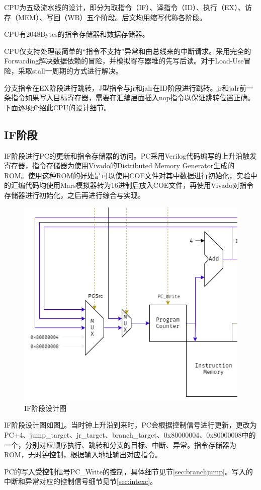 \documentclass[a4paper]{article}
\begin{document}
CPU为五级流水线的设计，即分为取指令（IF）、译指令（ID）、执行（EX）、访存（MEM）、写回（WB）五个阶段。后文均用缩写代称各阶段。

CPU有2048Bytes的指令存储器和数据存储器。

CPU仅支持处理最简单的“指令不支持”异常和由总线来的中断请求。采用完全的Forwarding解决数据依赖的冒险，并模拟寄存器堆的先写后读。对于Load-Use冒险，采取stall一周期的方式进行解决。

分支指令在EX阶段进行跳转，J型指令与jr和jalr在ID阶段进行跳转。jr和jalr前一条指令如果写入目标寄存器，需要在汇编层面插入nop指令以保证跳转位置正确。下面逐项介绍此CPU的设计细节。

\subsection{IF阶段}

IF阶段进行PC的更新和指令存储器的访问。PC采用Verilog代码编写的上升沿触发寄存器，指令存储器为使用Vivado的Distributed Memory Generator生成的ROM。使用这种ROM的好处是可以使用COE文件对其中数据进行初始化，实验中的汇编代码均使用Mars模拟器转为16进制后放入COE文件，再使用Vivado对指令存储器进行初始化，之后再进行综合与实现。

\begin{figure}[htb]
    \centering
    \includegraphics[width=.5\textwidth]{../assets/design_IF.png}
    \caption{IF阶段设计图}
    \label{fig:IF_design}
\end{figure}

IF阶段设计图如图\ref{fig:IF_design}。当时钟上升沿到来时，PC会根据控制信号进行更新，更改为PC+4、jump\_target、jr\_target、branch\_target、0x80000004、0x80000008中的一个，分别对应顺序执行、跳转和分支的目标、中断、异常。指令存储器为ROM，无时钟控制，根据输入地址输出对应指令。

PC的写入受控制信号PC\_Write的控制，具体细节见节\ref{sec:branchjump}。写入的中断和异常对应的控制信号细节见节\ref{sec:intexc}。
\end{document}
